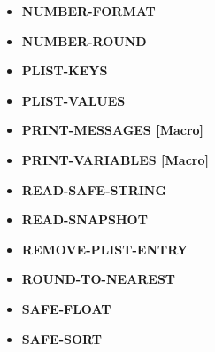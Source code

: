 \documentclass [11pt]{book}
\begin{document}
\begin{itemize}
\item {}
\textbf{NUMBER-FORMAT}





\item {}
\textbf{NUMBER-ROUND}





\item {}
\textbf{PLIST-KEYS}





\item {}
\textbf{PLIST-VALUES}





\item {}
\textbf{PRINT-MESSAGES [Macro]}





\item {}
\textbf{PRINT-VARIABLES [Macro]}





\item {}
\textbf{READ-SAFE-STRING}





\item {}
\textbf{READ-SNAPSHOT}





\item {}
\textbf{REMOVE-PLIST-ENTRY}





\item {}
\textbf{ROUND-TO-NEAREST}





\item {}
\textbf{SAFE-FLOAT}





\item {}
\textbf{SAFE-SORT}






\end{itemize}
\end{document}
